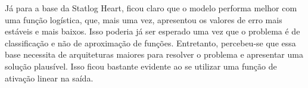 \documentclass{article}
\begin{document}
Já para a base da Statlog Heart, ficou claro que o modelo performa melhor com uma função logística, que, mais uma vez, apresentou os valores de erro mais estáveis e mais baixos. Isso poderia já ser esperado uma vez que o problema é de classificação e não de aproximação de funções. Entretanto, percebeu-se que essa base necessita de arquiteturas maiores para resolver o problema e apresentar uma solução plausível. Isso ficou bastante evidente ao se utilizar uma função de ativação linear na saída.
\end{document}
